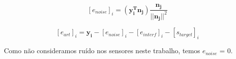     \medskip
    
    \begin{equation}
        \label{eq:enoise}
         [e_{noise}]_i  = (\mathbf{y_i^Tn_j})\frac{\mathbf{n_j}}{||\mathbf{n_j}||^2}
    \end{equation}
    
    \medskip
    
        \begin{equation}
        \label{eq:eart}
         [e_{art}]_i  = \mathbf{y_i} -  [e_{noise}]_i -  [e_{interf}]_i - [s_{target}]_i 
    \end{equation}
    
    Como não consideramos ruído nos sensores neste trabalho, temos $e_{noise}$ = 0.
    
    